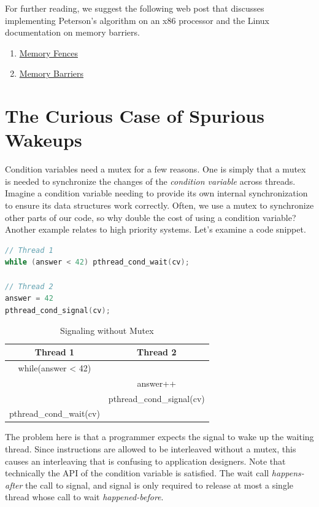 For further reading, we suggest the following web post that discusses implementing Peterson's algorithm on an x86 processor and the Linux documentation on memory barriers.
\begin{enumerate}
\item \href{http://bartoszmilewski.com/2008/11/05/who-ordered-memory-fences-on-an-x86/}{Memory Fences}
\item \href{https://www.kernel.org/doc/Documentation/memory-barriers.txt}{Memory Barriers}
\end{enumerate}


\section{The Curious Case of Spurious Wakeups}

Condition variables need a mutex for a few reasons.
One is simply that a mutex is needed to synchronize the changes of the \textit{condition variable} across threads.
Imagine a condition variable needing to provide its own internal synchronization to ensure its data structures work correctly.
Often, we use a mutex to synchronize other parts of our code, so why double the cost of using a condition variable?
Another example relates to high priority systems.
Let's examine a code snippet.

\begin{lstlisting}[language=C]
// Thread 1
while (answer < 42) pthread_cond_wait(cv);

// Thread 2
answer = 42
pthread_cond_signal(cv);
\end{lstlisting}

\begin{table}[h]
  \centering
\caption{Signaling without Mutex}
\begin{tabular}{|c|c|}
  Thread 1 & Thread 2 \\ \hline
  while(answer < 42) & \\
  & answer++ \\
  & pthread\_cond\_signal(cv) \\
  pthread\_cond\_wait(cv)
\end{tabular}
\end{table}
The problem here is that a programmer expects the signal to wake up the waiting thread.
Since instructions are allowed to be interleaved without a mutex, this causes an interleaving that is confusing to application designers.
Note that technically the API of the condition variable is satisfied.
The wait call \textit{happens-after} the call to signal, and signal is only required to release at most a single thread whose call to wait \textit{happened-before}.

